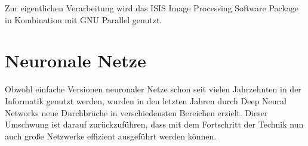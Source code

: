Zur eigentlichen Verarbeitung wird das ISIS Image Processing Software Package\cite{isis} in Kombination mit GNU Parallel\cite{gnuparallel} genutzt.

\section{Neuronale Netze}
\label{sec:neuronalenetze}

Obwohl einfache Versionen neuronaler Netze schon seit vielen Jahrzehnten in der Informatik genutzt werden, wurden in den letzten Jahren durch Deep Neural Networks neue Durchbrüche in verschiedensten Bereichen erzielt. Dieser Umschwung ist darauf zurückzuführen, dass mit dem Fortschritt der Technik nun auch große Netzwerke effizient ausgeführt werden können.
